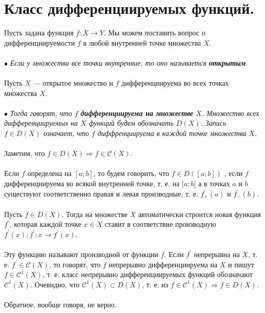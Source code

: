 \section{Класс дифференциируемых функций.}
Пусть задана функция $f : X \rightarrow Y$. Мы можем поставить вопрос о дифференциируемости $f$ в любой внутренней точке множества $X$.\\\\
$\bullet$ \textit{Если у множества все точки внутренние, то оно называется \textbf{открытым}.}\\\\
Пусть $X$ --- открытое множество и $f$ дифференциируема во всех точках множества $X$. \\\\
$\bullet$\textit{ Тогда говорят, что $f$ \textbf{дифференциируема на множестве} $X$. Множество всех дифференциируемых на $X$ функций будем обозначать $D(X)$. Запись $f \in D(X)$ означает, что $f$ диффренциируема в каждой точке множества $X$.}\\\\
Заметим, что $f \in D(X) \Rightarrow f \in \mathcal{C}(X)$.\\\\
Если $f$ определена на  $[a; b]$, то будем говорить, что $f \in D([a; b])$ , если $f$ дифференциируема во всякой внутренней точке, т. е. на $]a; b[$ а в точках $a$ и $b$ существуют соответственно правая и левая производные, т. е. $f_+^\prime(a)$ и $f_-^\prime(b)$.\\\\
Пусть $f \in D(X)$. Тогда на множестве $X$ автоматически строится новая функция $f^\prime$, которая каждой точке $x \in X$ ставит в соответствие производную $f^\prime(x) : f^\prime : x \rightarrow f^\prime(x)$.\\\\
Эту функцию называют производной от функции $f$. Если $f^\prime$ непрерывна на $X$, т. е. $f^\prime \in \mathcal{C}(X)$, то говорят, что $f$ непрерывно дифференциируема на $X$ и пишут $f \in \mathcal{C}^1(X)$, т. е. класс непрерывно дифференциируемых функций обозначают $\mathcal{C}^1(X)$. Очевидно, что $\mathcal{C}^1(X) \subset D(X)$, т. е. из $f \in \mathcal{C}^1(X) \Rightarrow f \in D(X)$.\\\\
Обратное, вообще говоря, не верно.
